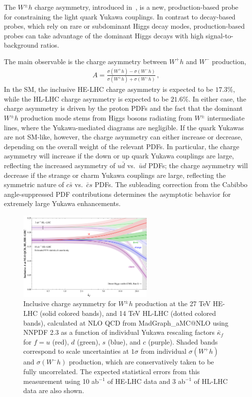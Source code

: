 \documentclass[../report.tex]{subfiles}
\begin{document}
The $W^\pm h$ charge asymmetry, introduced in~\cite{Yu:2016rvv}, is a
new, production-based probe for constraining the light quark Yukawa
couplings.  In contrast to decay-based probes, which rely on rare or
subdominant Higgs decay modes, production-based probes can take
advantage of the dominant Higgs decays with high signal-to-background
ratios.  

The main observable is the charge asymmetry between $W^+ h$ and $W^-$
production,
%
\begin{align}
	A 
= 	\frac{ \sigma (W^+ h) - \sigma (W^- h)}
	{\sigma (W^+ h) + \sigma (W^- h) } \, ,
\end{align}
%
In the SM, the inclusive HE-LHC charge asymmetry is expected to be $17.3\%$, while the HL-LHC charge asymmetry is expected to be $21.6\%$.  In either
case, the charge asymmetry is driven by the proton PDFs and the fact
that the dominant $W^\pm h$ production mode stems from Higgs bosons
radiating from $W^\pm$ intermediate lines, where the Yukawa-mediated
diagrams are negligible.  If the quark Yukawas are not SM-like,
however, the charge asymmetry can either increase or decrease,
depending on the overall weight of the relevant PDFs.  In particular,
the charge asymmetry will increase if the down or up quark Yukawa
couplings are large, reflecting the increased asymmetry of $u \bar{d}$
vs.~$\bar{u} d$ PDFs; the charge asymmetry will decrease if the
strange or charm Yukawa couplings are large, reflecting the symmetric
nature of $c \bar{s}$ vs.~$\bar{c} s$ PDFs.  The subleading correction
from the Cabibbo angle-suppressed PDF contributions determines the
asymptotic behavior for extremely large Yukawa enhancements.

\begin{figure}[tb!]
  \begin{center}
 \includegraphics[width=0.6\textwidth, angle=0]{section7/AsymmetryNLO_HELHC.pdf}
 \caption{Inclusive charge asymmetry for $W^\pm h$ production at the
   27 TeV HE-LHC (solid colored bands), and 14 TeV HL-LHC (dotted
   colored bands), calculated at NLO QCD from MadGraph\_aMC@NLO using
   NNPDF 2.3 as a function of individual Yukawa rescaling factors
   $\bar{\kappa}_f$ for $f = u$ (red), $d$ (green), $s$ (blue), and
   $c$ (purple).  Shaded bands correspond to scale uncertainties at
   $1\sigma$ from individual $\sigma(W^+ h)$ and $\sigma(W^- h)$
   production, which are conservatively taken to be fully
   uncorrelated.  The expected statistical errors from this
   measurement using 10 ab$^{-1}$ of HE-LHC data and 3 ab$^{-1}$ of
   HL-LHC data are also shown.}
  \label{fig:asymmetry}
  \end{center}
\end{figure}
\end{document}

